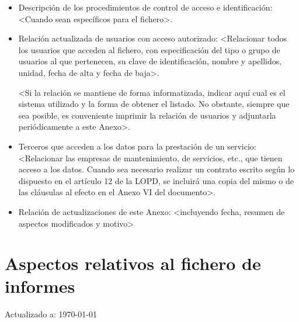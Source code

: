\documentclass[a4paper,11pt,bibtotoc,noliststotoc]{scrbook}
\begin{document}
\begin{itemize}
\item Descripción de los procedimientos de control de acceso e identificación: <Cuando sean específicos para el fichero>.

\item Relación actualizada de usuarios con acceso autorizado: <Relacionar todos los usuarios que acceden al fichero, con especificación del tipo o grupo de usuarios al que pertenecen, su clave de identificación, nombre y apellidos, unidad, fecha de alta y fecha de baja>.

<Si la relación se mantiene de forma informatizada, indicar aquí cual es el sistema utilizado y la forma de obtener el listado. No obstante, siempre que sea posible, es conveniente imprimir la relación de usuarios y adjuntarla periódicamente a este Anexo>.

\item Terceros que acceden a los datos para la prestación de un servicio: <Relacionar las empresas de mantenimiento, de servicios, etc., que tienen acceso a los datos. Cuando sea necesario realizar un contrato escrito según lo dispuesto en el artículo 12 de la LOPD, se incluirá una copia del mismo o de las cláusulas al efecto en el Anexo VI del documento>.

\item Relación de actualizaciones de este Anexo: <incluyendo fecha, resumen de aspectos modificados y motivo>

\end{itemize}








\section{Aspectos relativos al fichero de informes}


Actualizado a: \today
\end{document}
